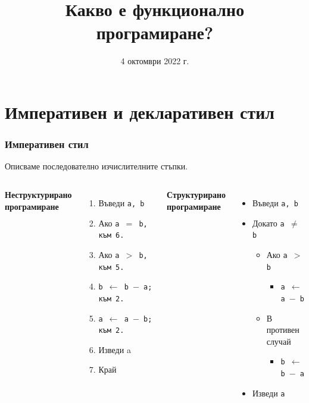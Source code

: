 \documentclass[alsotrans]{beamerswitch}
\title[Какво е ФП?]{Какво е функционално програмиране?}
\date{4 октомври 2022 г.}
\begin{document}
\begin{frame}
  \titlepage
\end{frame}

\section*{Императивен и декларативен стил}

\begin{frame}
  \frametitle{Императивен стил}

  Описваме последователно изчислителните стъпки.\\[2ex]
  \begin{columns}[t,onlytextwidth]

    \textbf{Неструктурирано\\програмиране}\\[2ex]
    \begin{enumerate}
    \item Въведи \tt a, \tt b
    \item Ако \tt{a $=$ b}, към 6.
    \item Ако \tt{a $>$ b}, към 5.
    \item \tt{b $\leftarrow$ b $-$ a}; към 2.
    \item \tt{a $\leftarrow$ a $-$ b}; към 2.
    \item Изведи a
    \item Край
    \end{enumerate}

    \textbf{Структурирано\\програмиране}\\[2ex]
    \begin{itemize}
    \item Въведи \tt a, \tt b
    \item Докато \tt{a $\neq$ b}
      \begin{itemize}
      \item Ако \tt{a $>$ b}
        \begin{itemize}
        \item \tt{a $\leftarrow$ a $-$ b}
        \end{itemize}
      \item В противен случай
        \begin{itemize}
        \item \tt{b $\leftarrow$ b $-$ a}
        \end{itemize}
      \end{itemize}
    \item Изведи \tt a
    \end{itemize}

  \end{columns}
\end{frame}
\end{document}
